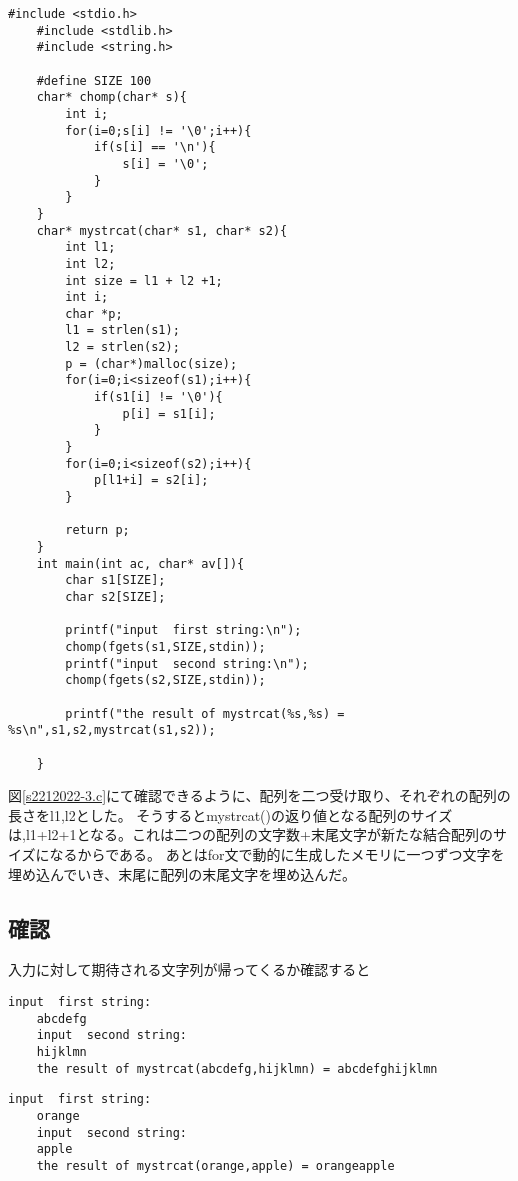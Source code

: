\documentclass[fontsize = 10pt, paper= a4,twocolumn,column_gap=3zw]{jlreq}
\begin{document}
\begin{lstlisting}[basicstyle=\ttfamily\footnotesize, frame=single, caption=s2212022-3.c,label=s2212022-3.c]
    #include <stdio.h>
    #include <stdlib.h>
    #include <string.h>
    
    #define SIZE 100
    char* chomp(char* s){
        int i;
        for(i=0;s[i] != '\0';i++){
            if(s[i] == '\n'){
                s[i] = '\0';
            }
        }
    }
    char* mystrcat(char* s1, char* s2){
        int l1;
        int l2;
        int size = l1 + l2 +1;
        int i;
        char *p;
        l1 = strlen(s1);
        l2 = strlen(s2);
        p = (char*)malloc(size);
        for(i=0;i<sizeof(s1);i++){
            if(s1[i] != '\0'){
                p[i] = s1[i];
            }
        }
        for(i=0;i<sizeof(s2);i++){
            p[l1+i] = s2[i];
        }
        
        return p;
    }
    int main(int ac, char* av[]){
        char s1[SIZE];
        char s2[SIZE];
    
        printf("input  first string:\n");
        chomp(fgets(s1,SIZE,stdin));
        printf("input  second string:\n");
        chomp(fgets(s2,SIZE,stdin));
    
        printf("the result of mystrcat(%s,%s) = %s\n",s1,s2,mystrcat(s1,s2));
       
    }
\end{lstlisting}

図\ref{s2212022-3.c}にて確認できるように、配列を二つ受け取り、それぞれの配列の長さをl1,l2とした。
そうするとmystrcat()の返り値となる配列のサイズは,l1+l2+1となる。これは二つの配列の文字数+末尾文字が新たな結合配列のサイズになるからである。
あとはfor文で動的に生成したメモリに一つずつ文字を埋め込んでいき、末尾に配列の末尾文字を埋め込んだ。

\subsection{確認}
入力に対して期待される文字列が帰ってくるか確認すると
\begin{lstlisting}[basicstyle=\ttfamily\footnotesize, frame=single, caption=test9,label=test9]
    input  first string:
    abcdefg
    input  second string:
    hijklmn
    the result of mystrcat(abcdefg,hijklmn) = abcdefghijklmn    
\end{lstlisting}

\begin{lstlisting}[basicstyle=\ttfamily\footnotesize, frame=single, caption=test10,label=test10]
    input  first string:
    orange
    input  second string:
    apple
    the result of mystrcat(orange,apple) = orangeapple
    
\end{lstlisting}
\end{document}
